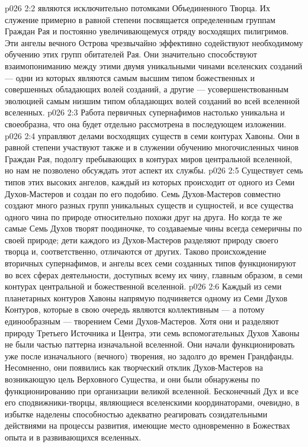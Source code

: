 \vs p026 2:2 \pc {} являются исключительно потомками Объединенного Творца. Их служение примерно в равной степени посвящается определенным группам Граждан Рая и постоянно увеличивающемуся отряду восходящих пилигримов. Эти ангелы вечного Острова чрезвычайно эффективно содействуют необходимому обучению этих групп обитателей Рая. Они значительно способствуют взаимопониманию между этими двумя уникальными чинами вселенских созданий --- одни из которых являются самым высшим типом божественных и совершенных обладающих волей созданий, а другие --- усовершенствованным эволюцией самым низшим типом обладающих волей созданий во всей вселенной вселенных.
\vs p026 2:3 \pc Работа первичных супернафимов настолько уникальна и своеобразна, что она будет отдельно рассмотрена в последующем изложении.
\vs p026 2:4 \pc {} управляют делами восходящих существ в семи контурах Хавоны. Они в равной степени участвуют также и в служении обучению многочисленных чинов Граждан Рая, подолгу пребывающих в контурах миров центральной вселенной, но нам не позволено обсуждать этот аспект их службы.
\vs p026 2:5 \pc Существует семь типов этих высоких ангелов, каждый из которых происходит от одного из Семи Духов\hyp{}Мастеров и создан по его подобию. Семь Духов\hyp{}Мастеров совместно создают много разных групп уникальных существ и сущностей, и все существа одного чина по природе относительно похожи друг на друга. Но когда те же самые Семь Духов творят поодиночке, то создаваемые чины всегда семеричны по своей природе; дети каждого из Духов\hyp{}Мастеров разделяют природу своего творца и, соответственно, отличаются от других. Таково происхождение вторичных супернафимов, и ангелы всех семи созданных типов функционируют во всех сферах деятельности, доступных всему их чину, главным образом, в семи контурах центральной и божественной вселенной.
\vs p026 2:6 \pc Каждый из семи планетарных контуров Хавоны напрямую подчиняется одному из Семи Духов Контуров, которые в свою очередь являются коллективным --- а потому единообразным --- творением Семи Духов\hyp{}Мастеров. Хотя они и разделяют природу Третьего Источника и Центра, эти семь вспомогательных Духов Хавоны не были частью паттерна изначальной вселенной. Они начали функционировать уже после изначального (вечного) творения, но задолго до времен Грандфанды. Несомненно, они появились как творческий отклик Духов\hyp{}Мастеров на возникающую цель Верховного Существа, и они были обнаружены по функционированию при организации великой вселенной. Бесконечный Дух и все его сподвижники\hyp{}творцы, являющиеся вселенскими координаторами, очевидно, в избытке наделены способностью адекватно реагировать созидательными действиями на процессы развития, имеющие место одновременно в Божествах опыта и в развивающихся вселенных.
